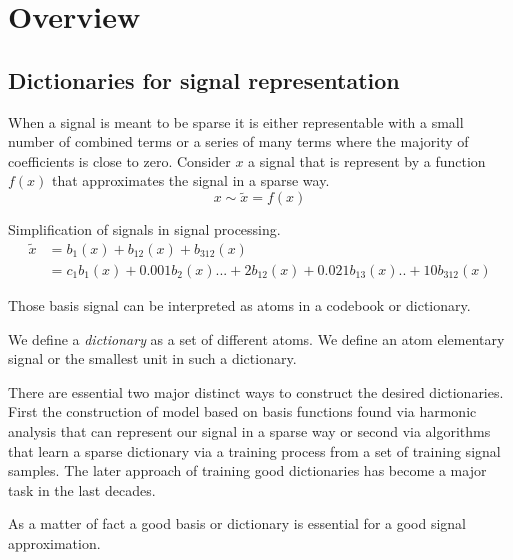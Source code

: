 \chapter{Overview}

\section{Dictionaries for signal representation}

When a signal is meant to be sparse it is either representable with a small
number of combined terms or a series of many terms where the majority of
coefficients is close to zero. Consider $x$ a signal that is represent by a
function $f(x)$ that approximates the signal in a sparse way.
\begin{equation*}
x \sim \tilde{x} = f\left(x\right)
\end{equation*}

Simplification of signals in signal processing.
\begin{equation*}
\begin{split}
\tilde{x} & = b_{1}(x) + b_{12}(x) + b_{312}(x)\\
& = c_{1}b_{1}(x) + 0.001b_{2}(x) ... + 2b_{12}(x) + 0.021b_{13}(x) .. +
10b_{312}(x)
\end{split}
\end{equation*}


Those basis signal can be interpreted as atoms in a codebook or dictionary.

We define a \emph{dictionary} as a set of different atoms. We define an atom
elementary signal or the smallest unit in such a dictionary.

There are essential two major distinct ways to construct the 
desired dictionaries. First the construction of model based on basis functions
found via harmonic analysis that can represent our signal in a sparse way or
second via algorithms that learn a sparse dictionary via a training process from
a set of training signal samples. The later approach of training good
dictionaries has become a major task in the last decades\cite{Mairal2010}.

As a matter of fact a good basis or dictionary is essential for a good
signal approximation\cite{}.

